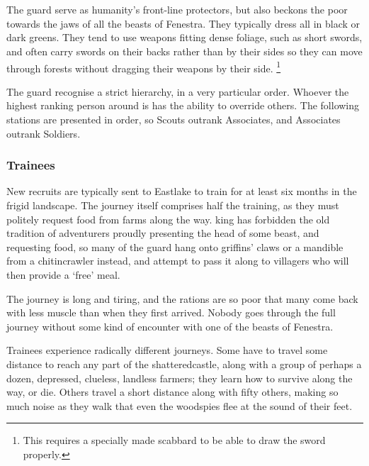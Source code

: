 \chapter{}

\label{guard}

\begin{multicols}{2}

\noindent
The \Gls{guard} serve as humanity's front-line protectors, but also beckons the poor towards the jaws of all the beasts of Fenestra.
They typically dress all in black or dark greens.
They tend to use weapons fitting dense foliage, such as short swords, and often carry swords on their backs rather than by their sides so they can move through forests without dragging their weapons by their side.%
\footnote{This requires a specially made scabbard to be able to draw the sword properly.}

The \Gls{guard} recognise a strict hierarchy, in a very particular order.
Whoever the highest ranking person around is has the ability to override others.
The following stations are presented in order, so Scouts outrank Associates, and Associates outrank Soldiers.

\subsection{Trainees}

New recruits are typically sent to Eastlake to train for at least six months in the frigid landscape.
The journey itself comprises half the training, as they must politely request food from farms along the way.
\Gls{king} has forbidden the old tradition of adventurers proudly presenting the head of some beast, and requesting food, so many of the guard hang onto griffins' claws or a mandible from a chitincrawler instead, and attempt to pass it along to villagers who will then provide a `free' meal.

The journey is long and tiring, and the rations are so poor that many come back with less muscle than when they first arrived.
Nobody goes through the full journey without some kind of encounter with one of the beasts of Fenestra.

Trainees experience radically different journeys.
Some have to travel some distance to reach any part of the \gls{shatteredcastle}, along with a group of perhaps a dozen, depressed, clueless, landless farmers; they learn how to survive along the way, or die.
Others travel a short distance along with fifty others, making so much noise as they walk that even the woodspies flee at the sound of their feet.


\end{multicols}
